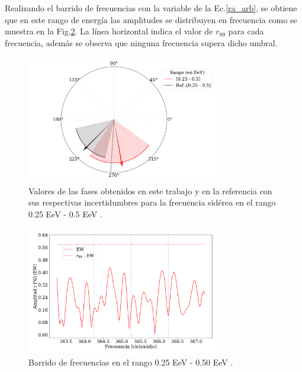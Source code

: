 Realizando el barrido de frecuencias con la variable de la Ec.\ref{ra_arb}, se obtiene que en este rango de energía las amplitudes se  distribuyen en frecuencia como se muestra en la Fig.\ref{fig:primer_barrido}. La línea horizontal indica el valor de $r_{99}$ para cada frecuencia, además se observa que ninguna frecuencia supera dicho umbral.

\begin{figure}[H]
    \begin{small}
        \begin{center}
            \includegraphics[width=0.75\textwidth]{phase_primer_bin.pdf}
        \end{center}
        \caption{Valores de las fases obtenidos en este trabajo y en la referencia con sus respectivas incertidumbres para la frecuencia sidérea en el  rango 0.25 EeV - 0.5 EeV .}
        \label{fig:primer}
    \end{small}
\end{figure}

\begin{figure}[H]
    \begin{small}
        \begin{center}
            \includegraphics[width=0.75\textwidth]{plot_bin_1_barrido_v3_EW.pdf}
        \end{center}
        \caption{Barrido de frecuencias en el  rango 0.25 EeV - 0.50 EeV .}
        \label{fig:primer_barrido}
    \end{small}
\end{figure}

